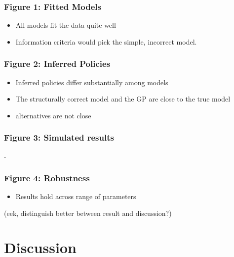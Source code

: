\documentclass[author-year, review]{elsarticle} %
\begin{document}
\subsubsection{Figure 1: Fitted Models}\label{figure-1-fitted-models}

\begin{itemize}
\itemsep1pt\parskip0pt
\item
  All models fit the data quite well
\item
  Information criteria would pick the simple, incorrect model.
\end{itemize}

\subsubsection{Figure 2: Inferred
Policies}\label{figure-2-inferred-policies}

\begin{itemize}
\itemsep1pt\parskip0pt
\item
  Inferred policies differ substantially among models
\item
  The structurally correct model and the GP are close to the true model
\item
  alternatives are not close
\end{itemize}

\subsubsection{Figure 3: Simulated
results}\label{figure-3-simulated-results}

-

\subsubsection{Figure 4: Robustness}\label{figure-4-robustness}

\begin{itemize}
\itemsep1pt\parskip0pt
\item
  Results hold across range of parameters
\end{itemize}

(eek, distinguish better between result and discussion?)

\section{Discussion}\label{discussion}
\end{document}
